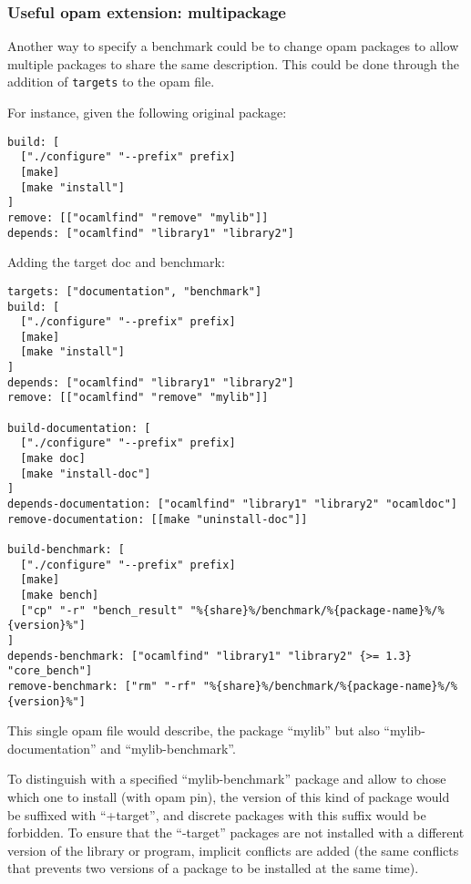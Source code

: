\documentclass[11pt,a4paper]{article}
\begin{document}
\subsubsection{Useful opam extension: multipackage}\label{opam-multipackage}

Another way to specify a benchmark could be to change opam packages to
allow multiple packages to share the same description. This could be
done through the addition of {\tt targets} to the opam file.

For instance, given the following original package:

\begin{verbatim}
build: [
  ["./configure" "--prefix" prefix]
  [make]
  [make "install"]
]
remove: [["ocamlfind" "remove" "mylib"]]
depends: ["ocamlfind" "library1" "library2"]
\end{verbatim}

Adding the target doc and benchmark:

\begin{verbatim}
targets: ["documentation", "benchmark"]
build: [
  ["./configure" "--prefix" prefix]
  [make]
  [make "install"]
]
depends: ["ocamlfind" "library1" "library2"]
remove: [["ocamlfind" "remove" "mylib"]]

build-documentation: [
  ["./configure" "--prefix" prefix]
  [make doc]
  [make "install-doc"]
]
depends-documentation: ["ocamlfind" "library1" "library2" "ocamldoc"]
remove-documentation: [[make "uninstall-doc"]]

build-benchmark: [
  ["./configure" "--prefix" prefix]
  [make]
  [make bench]
  ["cp" "-r" "bench_result" "%{share}%/benchmark/%{package-name}%/%{version}%"]
]
depends-benchmark: ["ocamlfind" "library1" "library2" {>= 1.3} "core_bench"]
remove-benchmark: ["rm" "-rf" "%{share}%/benchmark/%{package-name}%/%{version}%"]
\end{verbatim}

This single opam file would describe, the package ``mylib'' but also
``mylib-documentation'' and ``mylib-benchmark''.

To distinguish with a specified ``mylib-benchmark'' package and allow
to chose which one to install (with opam pin), the version of this
kind of package would be suffixed with ``+target'', and discrete
packages with this suffix would be forbidden. To ensure that the
``-target'' packages are not installed with a different version of the
library or program, implicit conflicts are added (the same conflicts
that prevents two versions of a package to be installed at the same
time).
\end{document}
